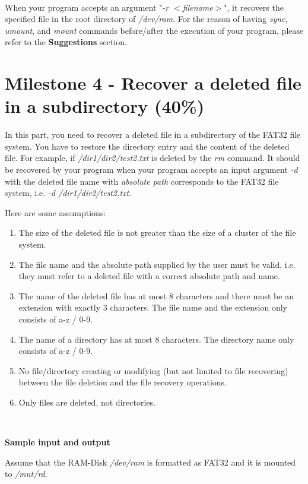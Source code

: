 \documentclass[a4paper,12pt]{article}
\begin{document}
~

When your program accepts an argument "\textit{-r $<$filename$>$}", it recovers the specified file in the root directory of \textit{/dev/ram}. For the reason of having \textit{sync}, \textit{umount}, and \textit{mount} commands before/after the execution of your program, please refer to the \textbf{Suggestions} section.

\section*{Milestone 4 - Recover a deleted file in a subdirectory (40\%)}

In this part, you need to recover a deleted file in a subdirectory of the FAT32 file system. You have to restore the directory entry and the content of the deleted file. For example, if \textit{/dir1/dir2/test2.txt} is deleted by the \textit{rm} command. It should be recovered by your program when your program accepts an input argument \textit{-d} with the deleted file name with  \textit{absolute path} corresponds to the FAT32 file system, i.e. \textit{-d /dir1/dir2/test2.txt}.

Here are some assumptions:
\begin{enumerate}
  \addtolength{\itemsep}{-4mm}
    \item The size of the deleted file is not greater than the size of a cluster of the file system.
    \item The file name and the absolute path supplied by the user must be valid, i.e. they must refer to a deleted file with a correct absolute path and name.
    \item The name of the deleted file has at most 8 characters
        and there must be an extension with exactly 3
        characters. The file name and the extension only consists of a-z / 0-9.
    \item The name of a directory has at most 8 characters.
        The directory name only consists of a-z / 0-9.
    \item No file/directory creating or modifying (but not limited to file recovering) between the file deletion and the file recovery operations.
    \item Only files are deleted, not directories.
\end{enumerate}

~

\noindent \textbf{Sample input and output}

Assume that the RAM-Disk \textit{/dev/ram} is formatted as FAT32 and it is mounted to \textit{/mnt/rd}.
\end{document}
